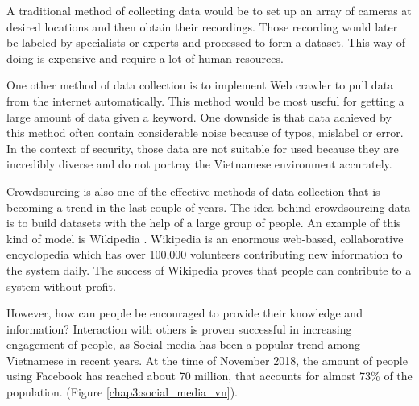 A traditional method of collecting data would be to set up an array of cameras at desired locations and then obtain their recordings. Those recording would later be labeled by specialists or experts and processed to form a dataset. This way of doing is expensive and require a lot of human resources. 

One other method of data collection is to implement Web crawler to pull data from the internet automatically. This method would be most useful for getting a large amount of data given a keyword. One downside is that data achieved by this method often contain considerable noise because of typos, mislabel or error. In the context of security, those data are not suitable for used because they are incredibly diverse and do not portray the Vietnamese environment accurately. 

Crowdsourcing is also one of the effective methods of data collection that is becoming a trend in the last couple of years. The idea behind crowdsourcing data is to build datasets with the help of a large group of people. An example of this kind of model is Wikipedia
. Wikipedia is an enormous web-based, collaborative encyclopedia which has over 100,000 volunteers contributing new information to the system daily. The success of Wikipedia proves that people can contribute to a system without profit. 

However, how can people be encouraged to provide their knowledge and information? Interaction with others is proven successful in increasing engagement of people, as Social media has been a popular trend among Vietnamese in recent years. At the time of November 2018, the amount of people using Facebook has reached about 70 million, that accounts for almost 73\% of the population. (Figure \ref{chap3:social_media_vn}).

